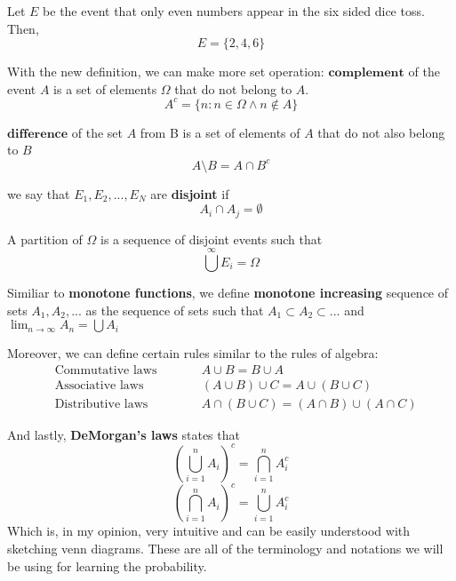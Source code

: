 \begin{example}
    Let $E$ be the event that only even numbers appear in the six sided dice toss. Then,
    $$E = \{2,4,6 \}$$
\end{example}
With the new definition, we can make more set operation: 
$\textbf{complement}$ of the event $A$ is a set of elements $\Omega$ that do not belong to $A$. 
$$A^{c} = \{n: n \in \Omega \land n \not\in A \}$$
\par
$\textbf{difference}$ of the set $A$ from B is a set of elements of $A$ that do not also belong to $B$
$$A \setminus B = A \cap B^c$$
\par we say that $E_1,E_2,...,E_N$ are \textbf{disjoint} if 
$$A_i \cap A_j =  \emptyset $$
\par
A partition of $\Omega$ is a sequence of disjoint events  such that $$\bigcup^{\infty} E_i = \Omega$$

\par 

Similiar to \textbf{monotone functions}, we define \textbf{monotone increasing} sequence of sets $A_1,A_2,...$ as the sequence of sets such that $A_1 \subset A_2 \subset...$ and $\lim_{n \rightarrow \infty} A_n = \bigcup A_i$

\par

Moreover, we can define certain rules similar to the rules of algebra:
$$\begin{aligned}
    &\text{Commutative laws} \qquad  &&A \cup B = B \cup A \\
    &\text{Associative laws} \qquad  &&(A \cup B) \cup C = A \cup (B \cup C) \\
    &\text{Distributive laws} \qquad &&A \cap (B \cup C) = (A \cap B) \cup (A \cap C)
\end{aligned}$$

\par

And lastly, \textbf{DeMorgan's laws} states that
$$ \left( \bigcup_{i=1}^n A_i \right) ^c = \bigcap_{i=1}^n A_i^c $$
$$ \left( \bigcap_{i=1}^n A_i \right) ^c = \bigcup_{i=1}^n A_i^c $$
Which is, in my opinion, very intuitive and can be easily understood with sketching venn diagrams.
These are all of the terminology and notations we will be using for learning the probability.









